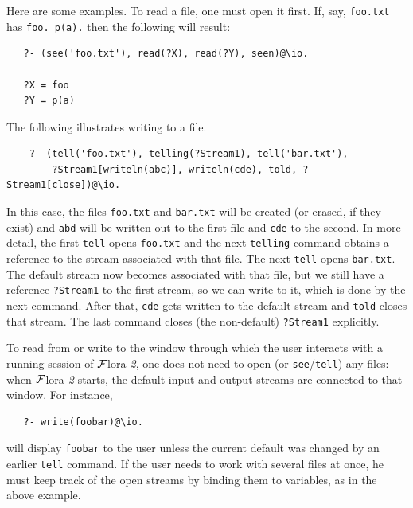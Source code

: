 \documentclass[11pt]{article}
\newcommand{\FLORA}{{\mbox{\sc ${\cal F}${lora}\rm\emph{-2}}}\xspace}
\newcommand{\FLSYSTEM}{\FLORA}
\begin{document}
Here are some examples.
To read a file, one must open it first. If, say,
\texttt{foo.txt} has \texttt{foo. p(a).} then the following will result:
\begin{verbatim}
   ?- (see('foo.txt'), read(?X), read(?Y), seen)@\io.

   ?X = foo
   ?Y = p(a)
\end{verbatim}
The following illustrates writing to a file.
\begin{verbatim}
    ?- (tell('foo.txt'), telling(?Stream1), tell('bar.txt'),
        ?Stream1[writeln(abc)], writeln(cde), told, ?Stream1[close])@\io.
\end{verbatim}
In this case, the files \texttt{foo.txt} and \texttt{bar.txt} will be
created (or erased, if they exist)  and \texttt{abd} will be written out to
the first file and \texttt{cde} to the second.  
In more detail, the first \texttt{tell} opens \texttt{foo.txt} and the next
\texttt{telling} command obtains a reference to the stream associated with
that file. The next \texttt{tell} opens \texttt{bar.txt}. The default
stream now becomes associated with that file, but we still have a reference
\texttt{?Stream1} to the first stream, so we can write to it, which is done
by the next command. After that, \texttt{cde} gets written to the default
stream and \texttt{told} closes that stream. The last command closes (the
non-default) \texttt{?Stream1} explicitly. 

To read from or write to the window through which the user interacts with a running
session of \FLSYSTEM, one does not need to open (or
\texttt{see}/\texttt{tell}) any files: when \FLSYSTEM starts, the default
input and output streams are connected to that window. For instance,
\begin{verbatim}
   ?- write(foobar)@\io.
\end{verbatim}
will display \texttt{foobar}  to the user unless the current default was
changed by an earlier \texttt{tell}  command. If the user needs to work
with several files at once, he must keep track of the open streams by
binding them to variables, as in the above example.
\end{document}
